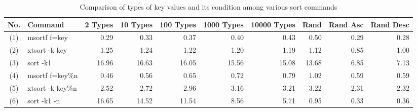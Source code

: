 \begin{table}[hbt]
\begin{center}
\caption{Comparison of types of key values and its condition among various sort commands}
\begin{tabular}{clrrrrrrrr}
\hline
No. & Command & 2 Types & 10 Types & 100 Types & 1000 Types & 10000 Types & Rand & Rand Asc & Rand Desc \\
\hline
(1)&msortf f=key&0.29&0.33&0.37&0.40&0.43&0.50&0.29&0.28 \\
(2)&xtsort -k key&1.25&1.24&1.22&1.20&1.19&1.12&0.85&1.00 \\
(3)&sort -k1&16.96&16.63&16.05&15.56&15.08&13.68&6.85&7.13 \\
\hline
(4)&msortf f=key\%n&0.46&0.56&0.65&0.72&0.79&1.02&0.59&0.59 \\
(5)&xtsort -k key\%n&2.52&2.72&2.96&3.16&3.21&3.22&2.31&2.32 \\
(6)&sort -k1 -n&16.65&14.52&11.54&8.56&5.71&0.95&0.33&0.36 \\
\hline
\end{tabular}
\end{center}
\end{table}
